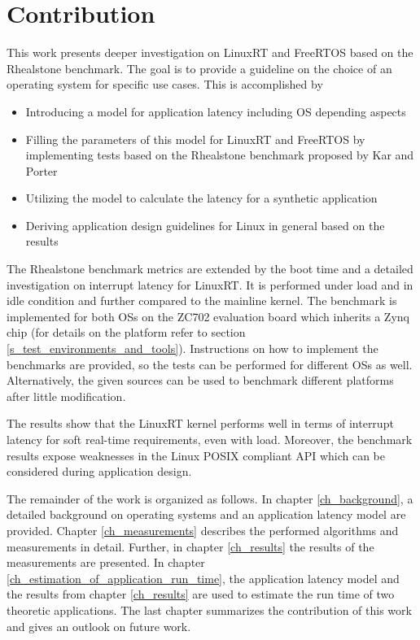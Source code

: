 \section{Contribution}
This work presents deeper investigation on LinuxRT and FreeRTOS based on the Rhealstone benchmark.
The goal is to provide a guideline on the choice of an operating system for specific use cases.
This is accomplished by
	\begin{itemize}
		\item Introducing a model for application latency including \ac{OS} depending aspects
		\item Filling the parameters of this model for LinuxRT and FreeRTOS by implementing tests based on the Rhealstone benchmark proposed by Kar and Porter \cite{kar:itrb} \cite{kar:artbp} 
		\item Utilizing the model to calculate the latency for a synthetic application 
		\item Deriving application design guidelines for Linux in general based on the results
	\end{itemize} 
The Rhealstone benchmark metrics are extended by the boot time and a detailed investigation on interrupt latency for LinuxRT. 
It is performed under load and in idle condition and further compared to the mainline kernel.
The benchmark is implemented for both \acp{OS} on the ZC702 evaluation board which inherits a Zynq chip (for details on the platform refer to section \ref{s_test_environments_and_tools}). 
Instructions on how to implement the benchmarks are provided, so the tests can be performed for different \acp{OS} as well.
Alternatively, the given sources can be used to benchmark different platforms after little modification.
\par
The results show that the LinuxRT kernel performs well in terms of interrupt latency for soft real-time requirements, even with load.
Moreover, the benchmark results expose weaknesses in the Linux POSIX compliant \ac{API} which can be considered during application design. 
\par
The remainder of the work is organized as follows. In chapter \ref{ch_background}, a detailed background on operating systems and an application latency model are provided. 
Chapter \ref{ch_measurements} describes the performed algorithms and measurements in detail. 
Further, in chapter \ref{ch_results} the results of the measurements are presented. 
In chapter \ref{ch_estimation_of_application_run_time}, the application latency model and the results from chapter \ref{ch_results} are used to estimate the run time of two theoretic applications.  
The last chapter summarizes the contribution of this work and gives an outlook on future work.